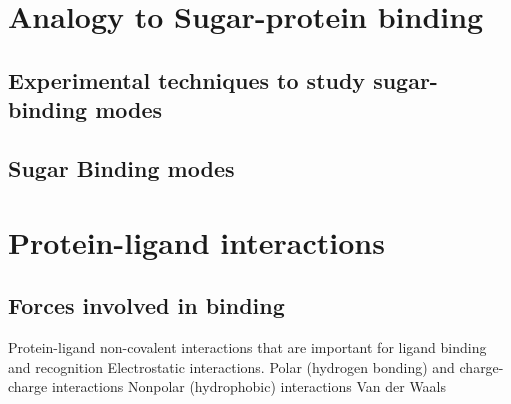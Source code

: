 \section{Analogy to Sugar-protein binding}
\subsection{Experimental techniques to study sugar-binding modes}
\subsection{Sugar Binding modes}

\section{Protein-ligand interactions}
\subsection{Forces involved in binding}
\begin{outline}
	\1 Protein-ligand non-covalent interactions that are important for ligand binding and recognition
		\2 Electrostatic interactions. Polar (hydrogen bonding) and charge-charge interactions
		\2 Nonpolar (hydrophobic) interactions
		  \3 Van der Waals
\end{outline}

